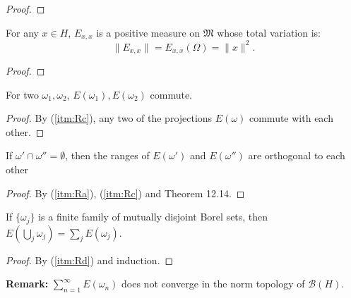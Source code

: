 \begin{proof}
\end{proof}

\begin{lemma}
  \label{lem:resId_measure}
  For any $x \in H$,
  \( E_{x,x} \) is a positive measure on \( \mathfrak{M} \) whose total variation is:
  \[
    \|E_{x,x}\| = E_{x,x}(\Omega) = \|x\|^2.
  \]
\end{lemma}

\begin{proof}

\end{proof}

\begin{lemma}
  \label{lem:resId_comm}
  \leanok
  For two $\omega_1, \omega_2$, \( E(\omega_1), E(\omega_2) \) commute.
\end{lemma}

\begin{proof}
  \leanok
  By (\ref{itm:Rc}), any two of the projections \( E(\omega) \) commute with each other.
\end{proof}

\begin{lemma}
  \label{lem:orthogonal_of_emptyset}
  \leanok
  If \( \omega' \cap \omega'' = \emptyset \),
  then the ranges of \( E(\omega') \) and \( E(\omega'') \) are orthogonal to each other
\end{lemma}

\begin{proof}
  \leanok
  By (\ref{itm:Ra}), (\ref{itm:Rc}) and Theorem 12.14.
\end{proof}

\begin{lemma}
  \label{lem:resId_iUnion}
  \leanok
  If $\{\omega_j\}$ is a finite family of mutually disjoint Borel sets, then
  $E(\bigcup_j \omega_j) = \sum_j E(\omega_j)$.
\end{lemma}

\begin{proof}
  \leanok
  By (\ref{itm:Rd}) and induction.
\end{proof}

\textbf{Remark:}
$\sum_{n=1}^{\infty} E(\omega_n)$ does not converge in the norm topology of $\mathcal{B}(H)$.


